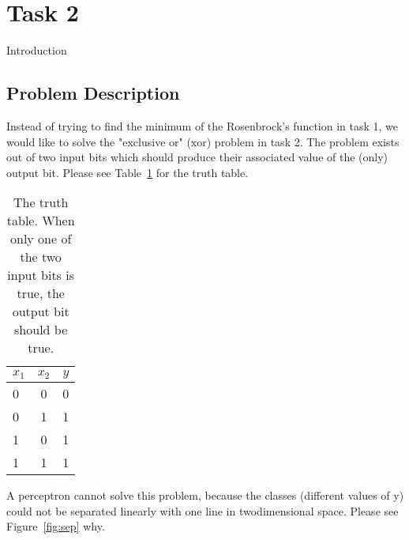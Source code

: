 \documentclass{article}
\begin{document}
\pagestyle{empty}

\def\layersep{3.5cm}

\section{Task 2}

Introduction

\subsection{Problem Description}
Instead of trying to find the minimum of the Rosenbrock's function in task 1, we would like to solve the "exclusive or" (xor) problem in task 2. The problem exists out of two input bits which should produce their associated value of the (only) output bit. Please see Table~\ref{tab:tt} for the truth table.

\begin{table}[!h]
	\centering
	\begin{tabular}{| l | c | r |}
		\hline
		$x_1$ & $x_2$ & $y$ \\ \hline
		0 & 0 & 0 \\ \hline
		0 & 1 & 1 \\ \hline
		1 & 0 & 1 \\ \hline
		1 & 1 & 1 \\ \hline
	\end{tabular}
	\caption{The truth table. When only one of the two input bits is true, the output bit should be true.}
	\label{tab:tt}
\end{table}

A perceptron cannot solve this problem, because the classes (different values of y) could not be separated linearly with one line in twodimensional space. Please see Figure~\ref{fig:sep} why. 
\end{document}
